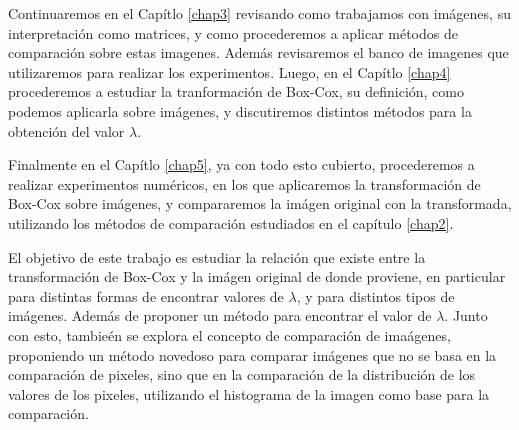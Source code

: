 Continuaremos en el Cap\'itlo \ref{chap3} revisando como trabajamos con im\'agenes, su interpretaci\'on como matrices, y como procederemos a aplicar m\'etodos de comparaci\'on sobre estas imagenes. Adem\'as revisaremos el banco de imagenes que utilizaremos para realizar los experimentos. Luego, en el Cap\'itlo \ref{chap4} procederemos a estudiar la tranformaci\'on de Box-Cox, su definici\'on, como podemos aplicarla sobre im\'agenes, y discutiremos distintos m\'etodos para la obtenci\'on del valor $\lambda$. 

Finalmente en el Cap\'itlo \ref{chap5}, ya con todo esto cubierto, procederemos a realizar experimentos num\'ericos, en los que aplicaremos la transformaci\'on de Box-Cox sobre im\'agenes, y compararemos la im\'agen original con la transformada, utilizando los m\'etodos de comparaci\'on estudiados en el cap\'itulo \ref{chap2}.

El objetivo de este trabajo es estudiar la relaci\'on que existe entre la transformaci\'on de Box-Cox y la im\'agen original de donde proviene, en particular para distintas formas de encontrar valores de $\lambda$, y para distintos tipos de im\'agenes. Adem\'as de proponer un m\'etodo para encontrar el valor de $\lambda$. Junto con esto, tambie\'en se explora el concepto de comparaci\'on de ima\'agenes, proponiendo un m\'etodo novedoso para comparar im\'agenes que no se basa en la comparaci\'on de pixeles, sino que en la comparaci\'on de la distribuci\'on de los valores de los pixeles, utilizando el histograma de la imagen como base para la comparaci\'on.